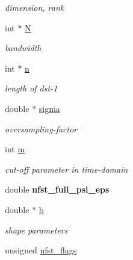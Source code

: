 \begin{CompactItemize}
\begin{CompactList}\small\item\em dimension, rank \item\end{CompactList}\item 
\hypertarget{structnfst__plan_o5}{
int $\ast$ \hyperlink{structnfst__plan_o5}{N}}
\label{structnfst__plan_o5}

\begin{CompactList}\small\item\em bandwidth \item\end{CompactList}\item 
\hypertarget{structnfst__plan_o6}{
int $\ast$ \hyperlink{structnfst__plan_o6}{n}}
\label{structnfst__plan_o6}

\begin{CompactList}\small\item\em length of dst-1 \item\end{CompactList}\item 
\hypertarget{structnfst__plan_o7}{
double $\ast$ \hyperlink{structnfst__plan_o7}{sigma}}
\label{structnfst__plan_o7}

\begin{CompactList}\small\item\em oversampling-factor \item\end{CompactList}\item 
\hypertarget{structnfst__plan_o8}{
int \hyperlink{structnfst__plan_o8}{m}}
\label{structnfst__plan_o8}

\begin{CompactList}\small\item\em cut-off parameter in time-domain \item\end{CompactList}\item 
\hypertarget{structnfst__plan_o9}{
double {\bf nfst\_\-full\_\-psi\_\-eps}}
\label{structnfst__plan_o9}

\item 
\hypertarget{structnfst__plan_o10}{
double $\ast$ \hyperlink{structnfst__plan_o10}{b}}
\label{structnfst__plan_o10}

\begin{CompactList}\small\item\em shape parameters \item\end{CompactList}\item 
\hypertarget{structnfst__plan_o11}{
unsigned \hyperlink{structnfst__plan_o11}{nfst\_\-flags}}
\label{structnfst__plan_o11}


\end{CompactItemize}
